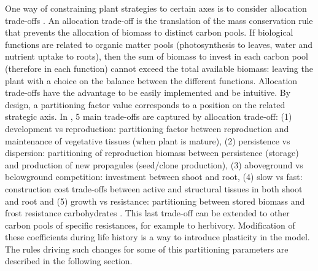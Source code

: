 One way of constraining plant strategies to certain axes is to consider allocation trade-offs \parencite{kleidon_global_2000, reineking_environmental_2006}. An allocation trade-off is the translation of the mass conservation rule that prevents the allocation of biomass to distinct carbon pools. If biological functions are related to organic matter pools (photosynthesis to leaves, water and nutrient uptake to roots), then the sum of biomass to invest in each carbon pool (therefore in each function) cannot exceed the total available biomass: leaving the plant with a choice on the balance between the different functions. Allocation trade-offs have the advantage to be easily implemented and be intuitive. By design, a partitioning factor value corresponds to a position on the related strategic axis. In \model, 5 main trade-offs are captured by allocation trade-off: (1) development vs reproduction: partitioning factor between reproduction and maintenance of vegetative tissues (when plant is mature), (2)  persistence vs dispersion: partitioning of reproduction biomass between persistence (storage) and production of new propagules (seed/clone production), (3) aboveground vs belowground competition: investment between shoot and root, \parencite{kleidon_global_2000, reineking_environmental_2006, taubert_modelling_2014}(4) slow vs fast: construction cost trade-offs between active and structural tissues in both shoot and root and (5) growth vs resistance: partitioning between stored biomass and frost resistance carbohydrates \parencite{cai_changes_2004}. This last trade-off can be extended to other carbon pools of specific resistances, for example to herbivory. Modification of these coefficients during life history is a way to introduce plasticity in the model. The rules driving such changes for some of this partitioning parameters are described in the following section.\\


